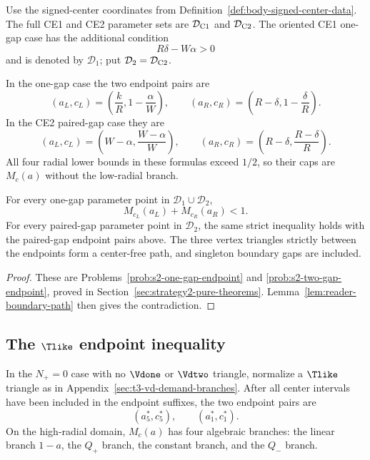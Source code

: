 \begin{definition}
\label{def:body-strategy2-signed-domains}
\label{def:body-gap-endpoint-data}
Use the signed-center coordinates from Definition~\ref{def:body-signed-center-data}.
The full CE1 and CE2 parameter sets are $\mathcal D_{\rm C1}$ and
$\mathcal D_{\rm C2}$.  The oriented CE1 one-gap case has the additional
condition
\[
 R\delta-W\alpha>0
\]
and is denoted by $\mathcal D_1$; put
$\mathcal D_2=\mathcal D_{\rm C2}$.

In the one-gap case the two endpoint pairs are
\[
 (a_L,c_L)=\left(\frac{k}{R},1-\frac{\alpha}{W}\right),
 \qquad
 (a_R,c_R)=\left(R-\delta,1-\frac{\delta}{R}\right).
\]
In the CE2 paired-gap case they are
\[
 (a_L,c_L)=\left(W-\alpha,\frac{W-\alpha}{W}\right),
 \qquad
 (a_R,c_R)=\left(R-\delta,\frac{R-\delta}{R}\right).
\]
All four radial lower bounds in these formulas exceed $1/2$, so their caps
are $M_c(a)$ without the low-radial branch.
\end{definition}

\begin{proposition}
\label{prop:body-all-vd0-endpoints}
For every one-gap parameter point in $\mathcal D_1\cup\mathcal D_2$,
\[
 M_{c_L}(a_L)+M_{c_R}(a_R)<1.
\]
For every paired-gap parameter point in $\mathcal D_2$, the same strict
inequality holds with the paired-gap endpoint pairs above.  The three vertex
triangles strictly between the endpoints form a center-free path, and
singleton boundary gaps are included.
\end{proposition}

\begin{proof}
These are Problems~\ref{prob:s2-one-gap-endpoint} and
\ref{prob:s2-two-gap-endpoint}, proved in
Section~\ref{sec:strategy2-pure-theorems}.  Lemma~\ref{lem:reader-boundary-path}
then gives the contradiction.
\end{proof}

\subsection{The $\Tlike$ endpoint inequality}

\begin{definition}
\label{def:body-t3-endpoint-state}
In the $N_+=0$ case with no $\Vdone$ or $\Vdtwo$ triangle, normalize a
$\Tlike$ triangle as in Appendix~\ref{sec:t3-vd-demand-branches}.  After all
center intervals have been included in the endpoint suffixes, the two endpoint
pairs are
\[
 (a_5^\ast,c_5^\ast),
 \qquad
 (a_1^\ast,c_1^\ast).
\]
On the high-radial domain, $M_c(a)$ has four algebraic branches: the linear
branch $1-a$, the $Q_+$ branch, the constant branch, and the $Q_-$ branch.
\end{definition}

